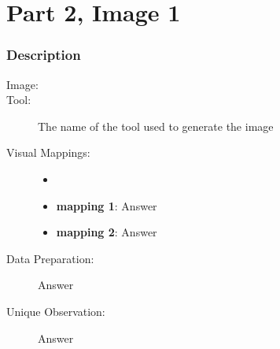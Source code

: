 \hypertarget{part-2-image-1}{%
\section{Part 2, Image 1}\label{part-1-design-2}}

\centering


\hypertarget{description}{%
	\subsubsection{Description}\label{description}}

\begin{description}
	\item[Image:]
	\item[Tool:]
	The name of the tool used to generate the image
	\item[Visual Mappings:]
	\begin{itemize}
		\tightlist
		\item[ ]
	\end{itemize}
	\begin{itemize}
		\tightlist
		\item
		\textbf{mapping 1}: Answer
	\end{itemize}
	
	\begin{itemize}
		\tightlist
		\item
		\textbf{mapping 2}: Answer
	\end{itemize}
	\item[Data Preparation:] Answer
	\item[Unique Observation:]
	Answer
	
\end{description}